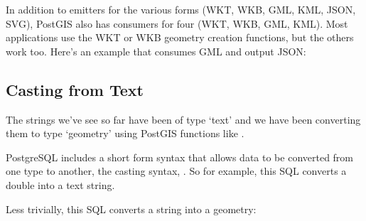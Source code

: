\documentclass[a4paper,11pt,english]{sphinxmanual}
\begin{document}
In addition to emitters for the various forms (WKT, WKB, GML, KML, JSON, SVG), PostGIS also has consumers for four (WKT, WKB, GML, KML). Most applications use the WKT or WKB geometry creation functions, but the others work too. Here’s an example that consumes GML and output JSON:

\begin{sphinxVerbatim}[commandchars=\\\{\}]
 
\end{sphinxVerbatim}



\subsection{Casting from Text}
\label{\detokenize{basic:casting-from-text}}
The {\hyperref[\detokenize{glossary:term-wkt}]{}} strings we’ve see so far have been of type ‘text’ and we have been converting them to type ‘geometry’ using PostGIS functions like .

PostgreSQL includes a short form syntax that allows data to be converted from one type to another, the casting syntax, . So for example, this SQL converts a double into a text string.

\begin{sphinxVerbatim}[commandchars=\\\{\}]
 
\end{sphinxVerbatim}

Less trivially, this SQL converts a {\hyperref[\detokenize{glossary:term-wkt}]{}} string into a geometry:

\begin{sphinxVerbatim}[commandchars=\\\{\}]
 
\end{sphinxVerbatim}
\end{document}
